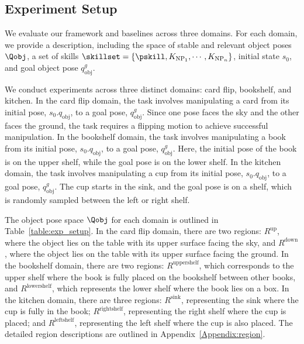 \subsection{Experiment Setup}
We evaluate our framework and baselines across three domains. For each domain, we provide a description, including the space of stable and relevant object poses $\Qobj$, a set of skills $\skillset=\{\pskill,K_{\text{NP}_1},\cdots,K_{\text{NP}_n}\}$, initial state $s_0$, and goal object pose $q_{\text{obj}}^g$.

We conduct experiments across three distinct domains: card flip, bookshelf, and kitchen. In the card flip domain, the task involves manipulating a card from its initial pose, \( s_0.q_{\text{obj}} \), to a goal pose, \( q_{\text{obj}}^g \). Since one pose faces the sky and the other faces the ground, the task requires a flipping motion to achieve successful manipulation. In the bookshelf domain, the task involves manipulating a book from its initial pose, \( s_0.q_{\text{obj}} \), to a goal pose, \( q_{\text{obj}}^g \). Here, the initial pose of the book is on the upper shelf, while the goal pose is on the lower shelf. In the kitchen domain, the task involves manipulating a cup from its initial pose, \( s_0.q_{\text{obj}} \), to a goal pose, \( q_{\text{obj}}^g \). The cup starts in the sink, and the goal pose is on a shelf, which is randomly sampled between the left or right shelf.

The object pose space $\Qobj$ for each domain is outlined in Table~\ref{table:exp_setup}. In the card flip domain, there are two regions: $R^\text{up}$, where the object lies on the table with its upper surface facing the sky, and $R^\text{down}$, where the object lies on the table with its upper surface facing the ground. In the bookshelf domain, there are two regions: \(R^\text{uppershelf}\), which corresponds to the upper shelf where the book is fully placed on the bookshelf between other books, and \(R^\text{lowershelf}\), which represents the lower shelf where the book lies on a box. In the kitchen domain, there are three regions: \( R^\text{sink} \), representing the sink where the cup is fully in the book; \( R^\text{rightshelf} \), representing the right shelf where the cup is placed; and \( R^\text{leftshelf} \), representing the left shelf where the cup is also placed. The detailed region descriptions are outlined in Appendix~\ref{Appendix:region}.

